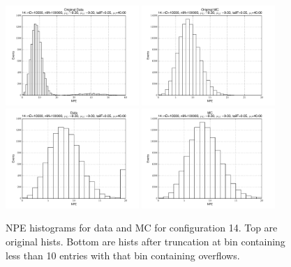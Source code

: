  \begin{figure}[htbp] \begin{center} 
\includegraphics[width=0.45\textwidth]{../FIGURES/14/FIG_Original_Data.pdf} 
\includegraphics[width=0.45\textwidth]{../FIGURES/14/FIG_Original_MC.pdf} 
\includegraphics[width=0.45\textwidth]{../FIGURES/14/FIG_Data.pdf} 
\includegraphics[width=0.45\textwidth]{../FIGURES/14/FIG_MC.pdf} 
\caption{NPE histograms for data and MC for configuration 14. Top are original hists. Bottom are hists after truncation at bin containing less than 10 entries with that bin containing overflows.} 
\label{tab:npe_14} 
\end{center} \end{figure} 

 